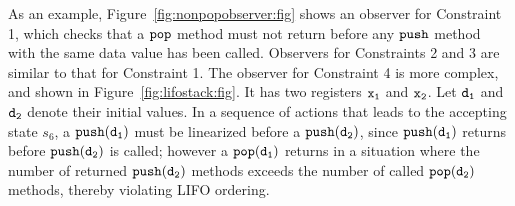 As an example, Figure~\ref{fig:nonpopobserver:fig} shows an observer for
Constraint 1, which checks
that a ${\tt pop}$ method must not return before any ${\tt push}$ method
with the same data value has been called.
Observers for Constraints 2 and 3 are similar to that for Constraint 1.
The observer for Constraint 4 is more complex,
and shown in Figure~\ref{fig:lifostack:fig}.
It has two registers $\tt x_1$ and $\tt x_2$. Let $\tt d_1$ and $\tt d_2$
denote their initial values.
In a sequence of actions that leads to the accepting state $s_6$, a
${\tt push(d_1)}$ must be linearized before a ${\tt push(d_2)}$, since
${\tt push(d_1)}$ returns before ${\tt push(d_2)}$ is called; however
a ${\tt pop(d_1)}$ returns in a situation where the number of returned
${\tt push(d_2)}$ methods exceeds the number of called
${\tt pop(d_2)}$ methods, thereby violating LIFO ordering.
